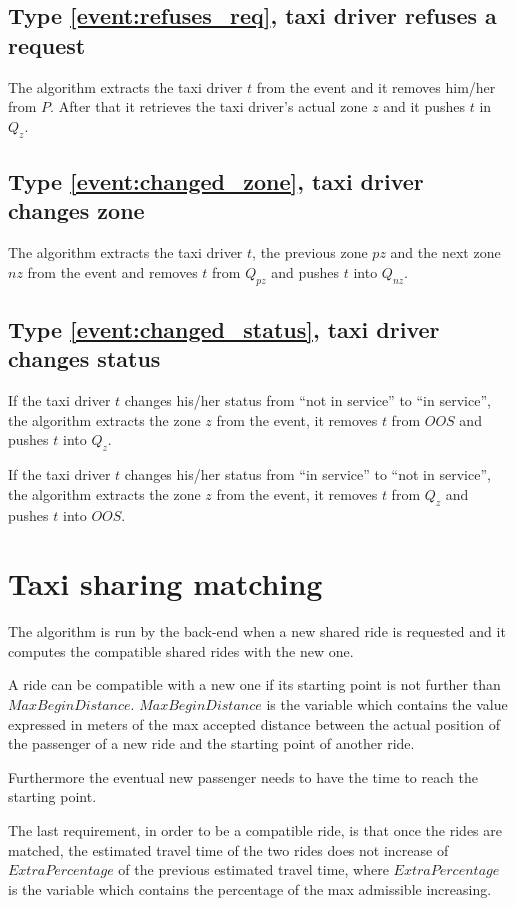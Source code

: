 \subsection{Type \ref{event:refuses_req}, taxi driver refuses a request}
The algorithm extracts the taxi driver $t$ from the event and it removes him/her from $P$. After that it retrieves the taxi driver's actual zone $z$ and it pushes $t$ in $Q_z$.

\subsection{Type \ref{event:changed_zone}, taxi driver changes zone}
The algorithm extracts the taxi driver $t$, the previous zone $pz$ and the next zone $nz$ from the event and removes $t$ from $Q_{pz}$ and pushes $t$ into $Q_{nz}$.

\subsection{Type \ref{event:changed_status}, taxi driver changes status}
If the taxi driver $t$ changes his/her status from “not in service” to “in service”, the algorithm extracts the zone $z$ from the event, it removes $t$ from $OOS$ and pushes $t$ into $Q_z$.

If the taxi driver $t$ changes his/her status from “in service” to “not in service”, the algorithm extracts the zone $z$ from the event, it removes $t$ from $Q_z$ and pushes $t$ into $OOS$.


\section{Taxi sharing matching}
The algorithm is run by the back-end when a new shared ride is requested and it computes the compatible shared rides with the new one.

A ride can be compatible with a new one if its starting point is not further than $MaxBeginDistance$. $MaxBeginDistance$ is the variable which contains the value expressed in meters of the max accepted distance between the actual position of the passenger of a new ride and the starting point of another ride.

Furthermore the eventual new passenger needs to have the time to reach the starting point.

The last requirement, in order to be a compatible ride, is that once the rides are matched, the estimated travel time of the two rides does not increase of $ExtraPercentage$ of the previous estimated travel time, where $ExtraPercentage$ is the variable which contains the percentage of the max admissible increasing.

